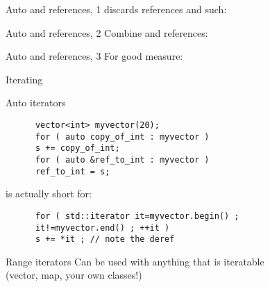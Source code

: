 \begin{block}{Auto and references, 1}
  \label{sl:auto-ref1}
   discards references and such:
\end{block}

\begin{block}{Auto and references, 2}
  \label{sl:auto-ref2}
  Combine  and references:
\end{block}

\begin{block}{Auto and references, 3}
  \label{sl:auto-ref3}
  For good measure:
\end{block}

\begin{comment}
  \begin{block}{Auto plus}
    \label{sl:auto-plus-const}
    Keywords like \n{const} and the reference character~\n{\&} can be
    added:
\begin{lstlisting}
// class member
  some_object my_object;
// class method:
  some_object &get_some_object() { return my_object; };
// main program:
auto object_copy  = thing.get_some_object();
auto &object_mutable  = thing.get_some_object();
const auto &object_immutable  = thing.get_some_object();
\end{lstlisting}
  \end{block}
\end{comment}

 {Iterating}

\begin{block}{Auto iterators}
  \label{sl:auto-iterator}
  \begin{multicols}{2}
    \begin{lstlisting}
      vector<int> myvector(20);
      for ( auto copy_of_int : myvector )
      s += copy_of_int;
      for ( auto &ref_to_int : myvector )
      ref_to_int = s;
    \end{lstlisting}
    is actually short for:
    \begin{lstlisting}
      for ( std::iterator it=myvector.begin() ;
      it!=myvector.end() ; ++it )
      s += *it ; // note the deref
    \end{lstlisting}
  \end{multicols}
  Range iterators Can be used with anything that is iteratable\\
  (vector, map, your own classes!)
\end{block}

